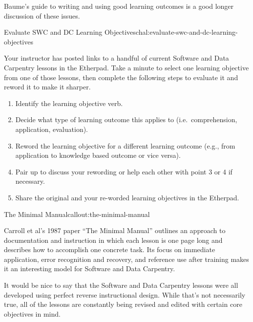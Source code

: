 Baume's guide to
writing and using good learning outcomes \cite{bib:baume-fixme} is a good longer discussion of these
issues.

\begin{challenge}{Evaluate SWC and DC Learning Objectives}{chal:evaluate-swc-and-dc-learning-objectives}

Your instructor has posted links to a handful of current Software and
Data Carpentry lessons in the Etherpad. Take a minute to select one
learning objective from one of those lessons, then complete the
following steps to evaluate it and reword it to make it sharper.

\begin{enumerate}
\item
  Identify the learning objective verb.
\item
  Decide what type of learning outcome this applies to
  (i.e.~comprehension, application, evaluation).
\item
  Reword the learning objective for a different learning outcome (e.g.,
  from application to knowledge based outcome or vice versa).
\item
  Pair up to discuss your rewording or help each other with point 3 or 4
  if necessary.
\item
  Share the original and your re-worded learning objectives in the Etherpad.
\end{enumerate}
\end{challenge}

\begin{callout}{The Minimal Manual}{callout:the-minimal-manual}

Carroll et al's 1987 paper
``The Minimal Manual'' \cite{bib:carroll-minimal-manual}
outlines an approach to documentation and instruction
in which each lesson is one page long and describes how to accomplish
one concrete task. Its focus on immediate application, error recognition
and recovery, and reference use after training makes it an interesting
model for Software and Data Carpentry.
\end{callout}


It would be nice to say that the Software and Data Carpentry lessons
were all developed using perfect reverse instructional design. While
that's not necessarily true, all of the lessons are constantly being
revised and edited with certain core objectives in mind.

